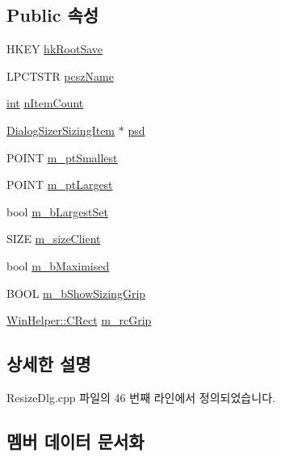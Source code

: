\subsection*{Public 속성}
\begin{DoxyCompactItemize}
\item 
H\+K\+EY \mbox{\hyperlink{struct_dialog_data_a25f688fc8282ac98c0d49658310425ce}{hk\+Root\+Save}}
\item 
L\+P\+C\+T\+S\+TR \mbox{\hyperlink{struct_dialog_data_a6ab5be3a7126b6f9b5fcb7131fcf2909}{pcsz\+Name}}
\item 
\mbox{\hyperlink{_util_8cpp_a0ef32aa8672df19503a49fab2d0c8071}{int}} \mbox{\hyperlink{struct_dialog_data_acd196414db13af6456bbb413f2d1fa7d}{n\+Item\+Count}}
\item 
\mbox{\hyperlink{struct_dialog_sizer_sizing_item}{Dialog\+Sizer\+Sizing\+Item}} $\ast$ \mbox{\hyperlink{struct_dialog_data_aefb399f16dab34e6a2da67716d6147fc}{psd}}
\item 
P\+O\+I\+NT \mbox{\hyperlink{struct_dialog_data_a48eb19417544d0c6ddfd1bd9c03cd2e5}{m\+\_\+pt\+Smallest}}
\item 
P\+O\+I\+NT \mbox{\hyperlink{struct_dialog_data_a577bccf59e71fb65969247d1f8275448}{m\+\_\+pt\+Largest}}
\item 
bool \mbox{\hyperlink{struct_dialog_data_abffcfeeb5f8f9b1ecd84d9bdf7706b07}{m\+\_\+b\+Largest\+Set}}
\item 
S\+I\+ZE \mbox{\hyperlink{struct_dialog_data_af63c4c59aa42a272798f9af446fc4484}{m\+\_\+size\+Client}}
\item 
bool \mbox{\hyperlink{struct_dialog_data_ad1a2c0f029c203945fde9ace5c82c625}{m\+\_\+b\+Maximised}}
\item 
B\+O\+OL \mbox{\hyperlink{struct_dialog_data_aba0ab2f5717e72e528e95a8a1c6a651e}{m\+\_\+b\+Show\+Sizing\+Grip}}
\item 
\mbox{\hyperlink{class_win_helper_1_1_c_rect}{Win\+Helper\+::\+C\+Rect}} \mbox{\hyperlink{struct_dialog_data_a3d543e5db55fefcd025e18f74558de8d}{m\+\_\+rc\+Grip}}
\end{DoxyCompactItemize}


\subsection{상세한 설명}


Resize\+Dlg.\+cpp 파일의 46 번째 라인에서 정의되었습니다.



\subsection{멤버 데이터 문서화}
\mbox{\label{struct_dialog_data_a25f688fc8282ac98c0d49658310425ce}} 
